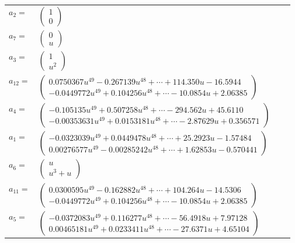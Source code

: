 \documentclass[1p]{elsarticle_modified}
\theoremstyle{definition}
\begin{document}
\begin{tabular}{m{7pt} m{180pt} m{7pt} m{180pt} }
\flushright $a_{2}=$&$\begin{pmatrix}1\\0\end{pmatrix}$ \\
\flushright $a_{7}=$&$\begin{pmatrix}0\\u\end{pmatrix}$ \\
\flushright $a_{3}=$&$\begin{pmatrix}1\\u^2\end{pmatrix}$ \\
\flushright $a_{12}=$&$\begin{pmatrix}0.0750367 u^{49}-0.267139 u^{48}+\cdots+114.350 u-16.5944\\-0.0449772 u^{49}+0.104256 u^{48}+\cdots-10.0854 u+2.06385\end{pmatrix}$ \\
\flushright $a_{4}=$&$\begin{pmatrix}-0.105135 u^{49}+0.507258 u^{48}+\cdots-294.562 u+45.6110\\-0.00353631 u^{49}+0.0153181 u^{48}+\cdots-2.87629 u+0.356571\end{pmatrix}$ \\
\flushright $a_{1}=$&$\begin{pmatrix}-0.0323039 u^{49}+0.0449478 u^{48}+\cdots+25.2923 u-1.57484\\0.00276577 u^{49}-0.00285242 u^{48}+\cdots+1.62853 u-0.570441\end{pmatrix}$ \\
\flushright $a_{6}=$&$\begin{pmatrix}u\\u^3+u\end{pmatrix}$ \\
\flushright $a_{11}=$&$\begin{pmatrix}0.0300595 u^{49}-0.162882 u^{48}+\cdots+104.264 u-14.5306\\-0.0449772 u^{49}+0.104256 u^{48}+\cdots-10.0854 u+2.06385\end{pmatrix}$ \\
\flushright $a_{5}=$&$\begin{pmatrix}-0.0372083 u^{49}+0.116277 u^{48}+\cdots-56.4918 u+7.97128\\0.00465181 u^{49}+0.0233411 u^{48}+\cdots-27.6371 u+4.65104\end{pmatrix}$ \\

\end{tabular}
\end{document}

